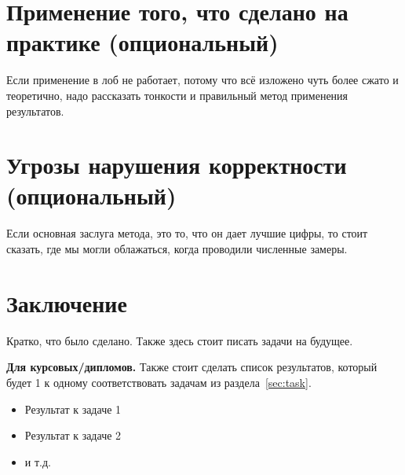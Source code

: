 \section{Применение того, что сделано на практике (опциональный)}

Если применение в лоб не работает, потому что всё изложено чуть более сжато и теоретично, надо рассказать тонкости и правильный метод применения результатов. 

\section{Угрозы нарушения корректности (опциональный)}

Если основная заслуга метода, это то, что он дает лучшие цифры, то стоит сказать, где мы могли облажаться, когда проводили численные замеры. 

\section{Заключение}

Кратко, что было сделано. Также здесь стоит писать задачи на будущее.

\textbf{Для курсовых/дипломов.} Также стоит сделать список результатов, который будет 1 к одному соответствовать задачам из раздела~\ref{sec:task}.

\begin{itemize}
\item Результат к задаче 1 
\item Результат к задаче 2
\item и т.д.
\end{itemize}



\setmonofont[Mapping=tex-text]{CMU Typewriter Text}



